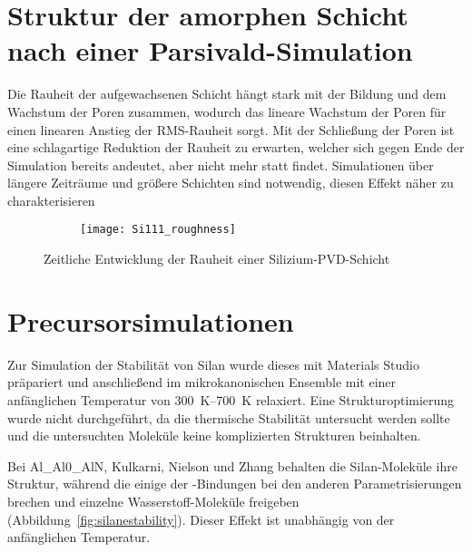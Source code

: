\section{Struktur der amorphen Schicht nach einer Parsivald-Simulation}

Die Rauheit der aufgewachsenen Schicht hängt stark mit der Bildung und dem Wachstum der Poren zusammen, wodurch das lineare Wachstum der Poren für einen linearen Anstieg der RMS-Rauheit sorgt.
Mit der Schließung der Poren ist eine schlagartige Reduktion der Rauheit zu erwarten, welcher sich gegen Ende der Simulation bereits andeutet, aber nicht mehr statt findet.
Simulationen über längere Zeiträume und größere Schichten sind notwendig, diesen Effekt näher zu charakterisieren

\begin{figure}[ht]
  \centering
  \captionsetup[subfigure]{singlelinecheck=false}
  \def\subfigwidth{0.48\textwidth}
  \begin{subfigure}[t]{\subfigwidth}
    \texttt{[image: Si111\_roughness]}
  \end{subfigure}
  \caption{Zeitliche Entwicklung der Rauheit einer Silizium-PVD-Schicht}
  \label{fig:siliconroughness}
\end{figure}

\section{Precursorsimulationen}

Zur Simulation der Stabilität von Silan wurde dieses mit Materials Studio präpariert und anschließend im mikrokanonischen Ensemble mit einer anfänglichen Temperatur von \SIrange{300}{700}{\kelvin} relaxiert.
Eine Strukturoptimierung wurde nicht durchgeführt, da die thermische Stabilität untersucht werden sollte und die untersuchten Moleküle keine komplizierten Strukturen beinhalten.

Bei Al\_Al0\_AlN, Kulkarni, Nielson und Zhang behalten die Silan-Moleküle ihre Struktur, während die einige der -Bindungen bei den anderen Parametrisierungen brechen und einzelne Wasserstoff-Moleküle freigeben (Abbildung~\ref{fig:silanestability}).
Dieser Effekt ist unabhängig von der anfänglichen Temperatur.

